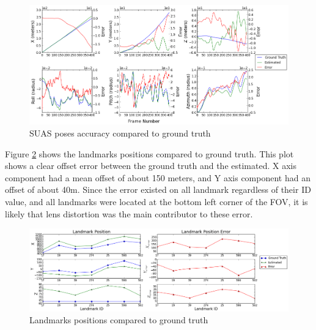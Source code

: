 \begin{figure}[h]
\centering
\includegraphics[width=17cm, keepaspectratio=true]
{./Figures/fltfig/airport/Figure10.png}
\caption{SUAS poses accuracy compared to ground truth}
\label{fltfig:13}
\end{figure}
\FloatBarrier

Figure \ref{fltfig:15} shows the landmarks positions compared to
ground truth. This plot shows a clear offset error between the ground
truth and the estimated. X axis component had a mean offset of about
150 meters, and Y axis component had an offset of about 40m. Since the
error existed on all landmark regardless of their ID value, and all
landmarks were located at the bottom left corner of the FOV, it is
likely that lens distortion was the main contributor to these error.


\begin{figure}[h]
\centering
\includegraphics[width=17cm, keepaspectratio=true]
{./Figures/fltfig/airport/Figure20.png}
\caption{Landmarks positions compared to ground truth}
\label{fltfig:15}
\end{figure}

